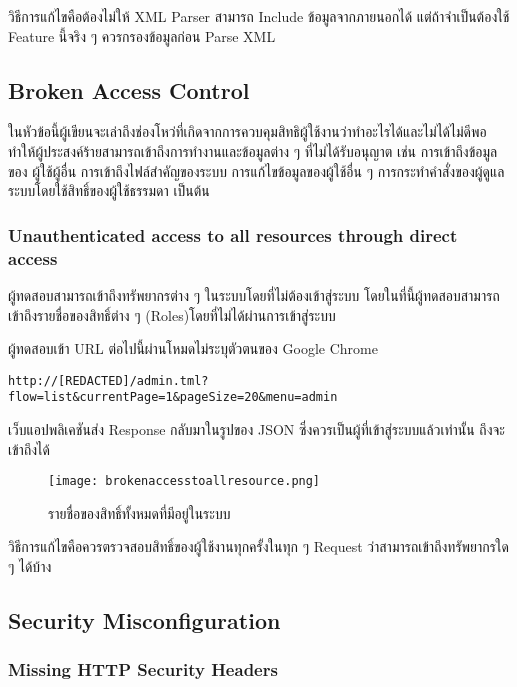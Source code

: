 วิธีการแก้ไขคือต้องไม่ให้ XML Parser สามารถ Include ข้อมูลจากภายนอกได้ แต่ถ้าจำเป็นต้องใช้ Feature นี้จริง ๆ ควรกรองข้อมูลก่อน Parse XML

\subsection{Broken Access Control}

ในหัวข้อนี้ผู้เขียนจะเล่าถึงช่องโหว่ที่เกิดจากการควบคุมสิทธิผู้ใช้งานว่าทำอะไรได้และไม่ได้ไม่ดีพอ ทำให้ผู้ประสงค์ร้ายสามารถเข้าถึงการทำงานและข้อมูลต่าง ๆ ที่ไม่ได้รับอนุญาต เช่น การเข้าถึงข้อมูลของ ผู้ใช้ผู้อื่น การเข้าถึงไฟล์สำคัญของระบบ การแก้ไขข้อมูลของผู้ใช้อื่น ๆ การกระทำคำสั่งของผู้ดูแลระบบโดยใช้สิทธิ์ของผู้ใช้ธรรมดา เป็นต้น

\subsubsection{Unauthenticated access to all resources through direct access}

ผู้ทดสอบสามารถเข้าถึงทรัพยากรต่าง ๆ ในระบบโดยที่ไม่ต้องเข้าสู่ระบบ โดยในที่นี้ผู้ทดสอบสามารถเข้าถึงรายชื่อของสิทธิ์ต่าง ๆ (Roles)โดยที่ไม่ได้ผ่านการเข้าสู่ระบบ

ผู้ทดสอบเข้า URL ต่อไปนี้ผ่านโหมดไม่ระบุตัวตนของ Google Chrome

\begin{lstlisting}[numbers=none] 
http://[REDACTED]/admin.tml?flow=list&currentPage=1&pageSize=20&menu=admin
\end{lstlisting}

เว็บแอปพลิเคชันส่ง Response กลับมาในรูปของ JSON ซึ่งควรเป็นผู้ที่เข้าสู่ระบบแล้วเท่านั้น ถึงจะเข้าถึงได้

 \begin{figure}[h]
	\centering
	\texttt{[image: brokenaccesstoallresource.png]}
	\caption{รายชื่อของสิทธิ์ทั้งหมดที่มีอยู่ในระบบ}
	\label{Fig:brokenaccesstoallresource.png}
\end{figure}

วิธีการแก้ไขคือควรตรวจสอบสิทธิ์ของผู้ใช้งานทุกครั้งในทุก ๆ Request ว่าสามารถเข้าถึงทรัพยากรใด ๆ ได้บ้าง

\subsection{Security Misconfiguration}

\subsubsection{Missing HTTP Security Headers}

